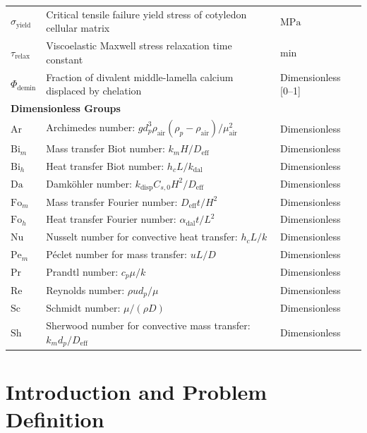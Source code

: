 \documentclass[10pt,a4paper]{article}
\begin{document}
\begin{longtable}{p{2.5cm}p{10.2cm}p{3.0cm}}
$\sigma_{\mathrm{yield}}$ & Critical tensile failure yield stress of cotyledon cellular matrix & $\mathrm{MPa}$ \\
$\tau_{\mathrm{relax}}$ & Viscoelastic Maxwell stress relaxation time constant & $\mathrm{min}$ \\
$\Phi_{\mathrm{demin}}$ & Fraction of divalent middle-lamella calcium displaced by chelation & Dimensionless [0--1] \\
\midrule
\multicolumn{3}{l}{\textbf{Dimensionless Groups}} \\
$\mathrm{Ar}$ & Archimedes number: $g d_p^3 \rho_{\mathrm{air}} (\rho_p - \rho_{\mathrm{air}}) / \mu_{\mathrm{air}}^2$ & Dimensionless \\
$\mathrm{Bi}_m$ & Mass transfer Biot number: $k_m H / D_{\mathrm{eff}}$ & Dimensionless \\
$\mathrm{Bi}_h$ & Heat transfer Biot number: $h_c L / k_{\mathrm{dal}}$ & Dimensionless \\
$\mathrm{Da}$ & Damk\"{o}hler number: $k_{\mathrm{disp}} C_{s,0} H^2 / D_{\mathrm{eff}}$ & Dimensionless \\
$\mathrm{Fo}_m$ & Mass transfer Fourier number: $D_{\mathrm{eff}} t / H^2$ & Dimensionless \\
$\mathrm{Fo}_h$ & Heat transfer Fourier number: $\alpha_{\mathrm{dal}} t / L^2$ & Dimensionless \\
$\mathrm{Nu}$ & Nusselt number for convective heat transfer: $h_c L / k$ & Dimensionless \\
$\mathrm{Pe}_m$ & P\'{e}clet number for mass transfer: $u L / D$ & Dimensionless \\
$\mathrm{Pr}$ & Prandtl number: $c_p \mu / k$ & Dimensionless \\
$\mathrm{Re}$ & Reynolds number: $\rho u d_p / \mu$ & Dimensionless \\
$\mathrm{Sc}$ & Schmidt number: $\mu / (\rho D)$ & Dimensionless \\
$\mathrm{Sh}$ & Sherwood number for convective mass transfer: $k_m d_p / D_{\mathrm{eff}}$ & Dimensionless \\
\bottomrule
\end{longtable}


\section{Introduction and Problem Definition}
\end{document}
